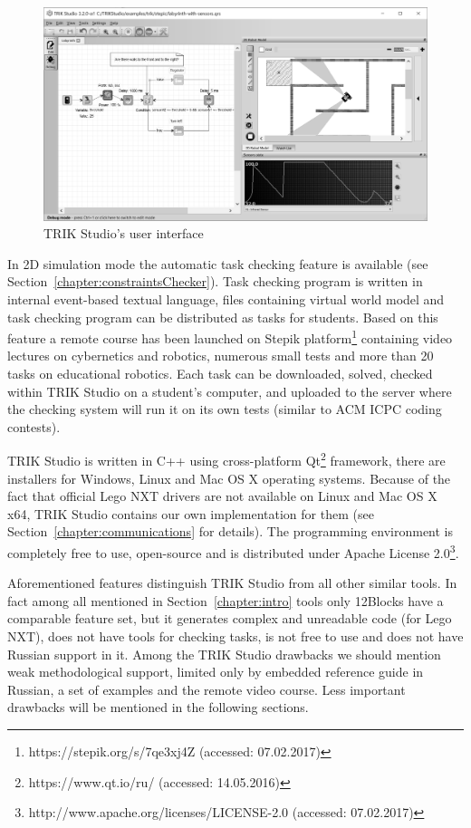 \documentclass[conference]{IEEEtran}
\begin{document}
\begin{figure}[ht]
    \centering
    \includegraphics[width=\textwidth]{TS_CF_Labyrinth.png}
    \caption{TRIK Studio's user interface}
    \label{image:TS_interface}
\end{figure}

In 2D simulation mode the automatic task checking feature is available (see Section~\ref{chapter:constraintsChecker}). Task checking program is written in internal event-based textual language, files containing virtual world model and task checking program can be distributed as tasks for students. Based on this feature a remote course has been launched on Stepik platform\footnote{https://stepik.org/s/7qe3xj4Z (accessed: 07.02.2017)} containing video lectures on cybernetics and robotics, numerous small tests and more than 20 tasks on educational robotics. Each task can be downloaded, solved, checked within TRIK Studio on a student's computer, and uploaded to the server where the checking system will run it on its own tests (similar to ACM ICPC coding contests).

TRIK Studio is written in C++ using cross-platform Qt\footnote{https://www.qt.io/ru/ (accessed: 14.05.2016)} framework, there are installers for Windows, Linux and Mac OS X operating systems. Because of the fact that official Lego NXT drivers are not available on Linux and Mac OS X x64, TRIK Studio contains our own implementation for them (see Section~\ref{chapter:communications} for details). The programming environment is completely free to use, open-source and is distributed under Apache License 2.0\footnote{http://www.apache.org/licenses/LICENSE-2.0 (accessed: 07.02.2017)}.

Aforementioned features distinguish TRIK Studio from all other similar tools. In fact among all mentioned in Section~\ref{chapter:intro} tools only 12Blocks have a comparable feature set, but it generates complex and unreadable code (for Lego NXT), does not have tools for checking tasks, is not free to use and does not have Russian support in it. Among the TRIK Studio drawbacks we should mention weak methodological support, limited only by embedded reference guide in Russian, a set of examples and the remote video course. Less important drawbacks will be mentioned in the following sections. 
\end{document}
